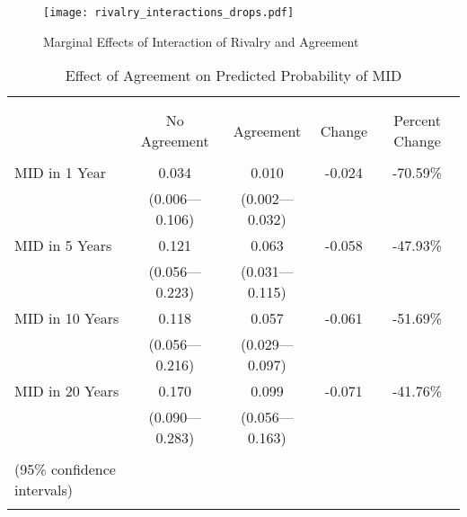 \documentclass{article}
\begin{document}
\begin{figure}
\caption{Marginal Effects of Interaction of Rivalry and Agreement}
\texttt{[image: rivalry\_interactions\_drops.pdf]}
\end{figure}

\begin{table}[!htbp] \centering 
  \caption{Effect of Agreement on Predicted Probability of MID} 
  \label{} 
\begin{tabular}{@{\extracolsep{5pt}}lcccc} 
\\[-1.8ex]\hline \\[-1.8ex] 
\\[-1.8ex] & No Agreement & Agreement & Change & Percent Change \\ 
\hline \\[-1.8ex] 
 MID in 1 Year & 0.034 & 0.010 & -0.024 & -70.59\% \\ 
  & (0.006---0.106) & (0.002---0.032) & &\\ 
  MID in 5 Years & 0.121 & 0.063 & -0.058 & -47.93\% \\ 
  & (0.056---0.223) & (0.031---0.115)  &  &\\ 
  MID in 10 Years & 0.118 & 0.057  & -0.061 & -51.69\% \\
  & (0.056---0.216) & (0.029---0.097)  &  &\\ 
  MID in 20 Years & 0.170 & 0.099 & -0.071 & -41.76\% \\ 
  & (0.090---0.283) & (0.056---0.163) & & \\
\hline \\[-1.8ex] 
(95\% confidence intervals) \\ 
\normalsize 
\end{tabular} 
\end{table} 
\end{document}
